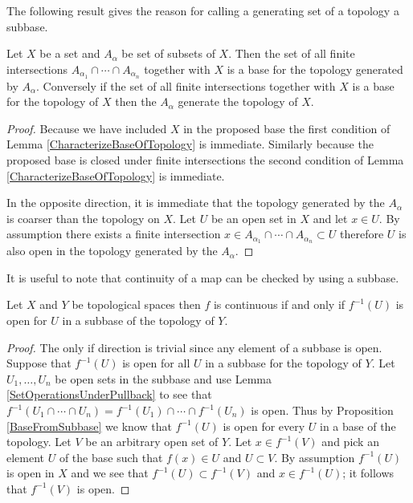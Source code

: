 The following result gives the reason for calling a generating set of a topology a subbase.
\begin{prop}\label{BaseFromSubbase}Let $X$ be a set and $A_\alpha$ be set of subsets of $X$.  Then the set of all finite intersections $A_{\alpha_1} \cap \dotsb \cap A_{\alpha_n}$ together with $X$ is a base for the topology generated by $A_\alpha$.  Conversely if the set of all finite intersections together with $X$ is a base for the topology of $X$ then the $A_\alpha$ generate the topology of $X$.
\end{prop}
\begin{proof}
Because we have included $X$ in the proposed base the first condition of Lemma \ref{CharacterizeBaseOfTopology} is immediate.  Similarly because the proposed base is closed under finite intersections the second condition of Lemma \ref{CharacterizeBaseOfTopology} is immediate.

In the opposite direction, it is immediate that the topology generated by the $A_\alpha$ is coarser than the topology on $X$.  Let $U$ be an open set in $X$ and let $x \in U$.  By assumption there exists a finite intersection $x \in A_{\alpha_1} \cap \dotsb \cap A_{\alpha_n} \subset U$ therefore $U$ is also open in the topology generated by the $A_\alpha$.
\end{proof}

It is useful to note that continuity of a map can be checked by using a subbase.
\begin{prop}\label{ContinuityViaSubbase}Let $X$ and $Y$ be topological spaces then $f$ is continuous if and only if $f^{-1}(U)$ is open for $U$ in a subbase of the topology of $Y$.
\end{prop}
\begin{proof}
The only if direction is trivial since any element of a subbase is open.  Suppose that $f^{-1}(U)$ is open for all $U$ in a subbase for the topology of $Y$.  Let $U_1, \dotsc, U_n$ be open sets in the subbase and use Lemma \ref{SetOperationsUnderPullback} to see that $f^{-1}(U_1 \cap \dotsb \cap U_n) = f^{-1}(U_1) \cap \dotsb \cap f^{-1}(U_n)$ is open.  Thus by Proposition \ref{BaseFromSubbase} we know that $f^{-1}(U)$ is open for every $U$ in a base of the topology.  Let $V$ be an
arbitrary open set of $Y$.  Let $x \in f^{-1}(V)$ and pick an element $U$ of the base such that $f(x) \in U$ and $U \subset V$.  By assumption $f^{-1}(U)$ is open in
$X$ and we see that $f^{-1}(U) \subset f^{-1}(V)$ and $x \in f^{-1}(U)$; it follows that $f^{-1}(V)$ is open.
\end{proof}

